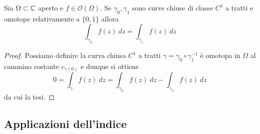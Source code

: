 \begin{corollary}
  Sia $\Omega \subset \mathbb{C}$ aperto e $f \in \mathcal{O}(\Omega)$. Se
  $\gamma_0, \gamma_1$ sono curve chiuse di classe $C^1$ a tratti e omotope
  relativamente a $\{0,1\}$ allora 
  \begin{equation*}
    \int_{\gamma_0} f(z)\ dz = \int_{\gamma_1} f(z)\ dz
  \end{equation*}
  \label{cor:omotopia-curve-aperte-implica-integrali-di-linea-uguali}
\end{corollary}
\begin{proof}
  Possiamo definire la curva chiusa $C^1$ a tratti $\gamma = \gamma_0 \circ
  \gamma^{-1}_1$ è omotopa in $\Omega$ al cammino costante
  $c_{\gamma(0)}$ e dunque si ottiene 
  \begin{equation*}
    0 = \int_\gamma f(z)\ dz = \int_{\gamma_0} f(z)\ dz - \int_{\gamma_1}
    f(z)\ dz
  \end{equation*}
  da cui la tesi.
\end{proof}

\subsection{\textcolor{AnComp}{\textbf{Applicazioni dell'indice}}}

